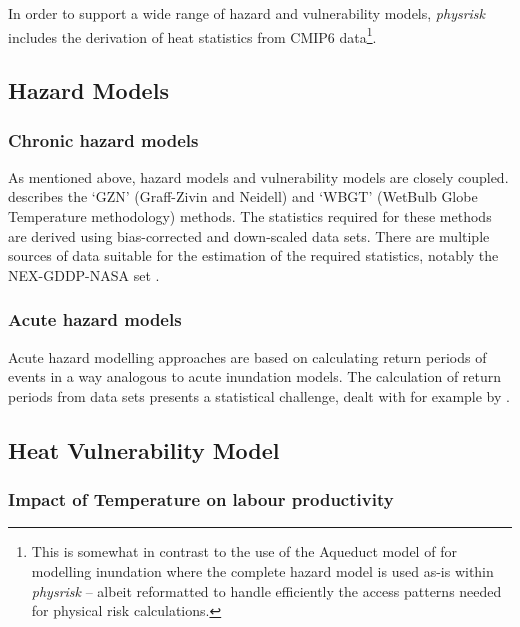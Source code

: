\documentclass[a4paper,11pt]{extarticle} %
\theoremstyle{definition}
\begin{document}
In order to support a wide range of hazard and vulnerability models,  \emph{physrisk} includes the derivation of heat statistics from CMIP6 data\footnote{This is somewhat in contrast to the use of the Aqueduct model of \cite{WardEtAl:2020} for modelling inundation where the complete hazard model is used as-is within \emph{physrisk} -- albeit reformatted to handle efficiently the access patterns needed for physical risk calculations.}.

\subsection{Hazard Models}

\subsubsection{Chronic hazard models}
As mentioned above, hazard models and vulnerability models are closely coupled. \cite{ZhangAndShindell:2021} describes the `GZN' (Graff-Zivin and Neidell) and `WBGT' (WetBulb Globe Temperature methodology) methods. The statistics required for these methods are derived using bias-corrected and down-scaled data sets. There are multiple sources of data suitable for the estimation of the required statistics, notably the NEX-GDDP-NASA set \cite{ThrasherEtAl:2022}.



\subsubsection{Acute hazard models}
Acute hazard modelling approaches are based on calculating return periods of events in a way analogous to acute inundation models. The calculation of return periods from data sets presents a statistical challenge, dealt with for example by \cite{MentaschiEtAl:2016}.



\subsection{Heat Vulnerability Model}

\label{SubSec:HeatVulnerabilityModel}

\subsubsection{Impact of Temperature on labour productivity}
\end{document}
